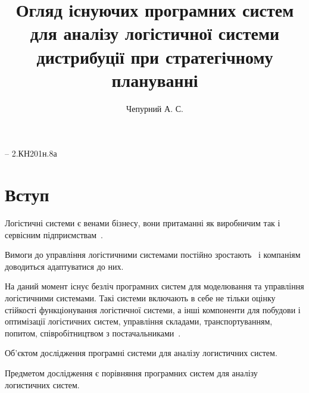 


\usepackage{lastpage}
\usepackage{calc}
\usepackage{soul}
\usepackage{pbox}
\usepackage{ulem}
\usepackage{titling}
\usepackage{framed}
\usepackage{tabu}
\usepackage{lscape}
\usepackage{appendix}
\usepackage{pdflscape}
\usepackage{longtable}
\usepackage[figure,table]{totalcount}

\title{Огляд існуючих програмних систем для аналізу логістичної системи дистрибуції при стратегічному плануванні}
\author{Чепурний А. С.}
 



\Ukrainian

\begin{titlepage}
\begin{center}
	\small
		\textbf{\theauthor} -- 2.КН201н.8а
\end{center}

\vspace*{\fill}
\begin{center}
	\Large
		\thetitle
\end{center}
\vspace*{\fill}

\end{titlepage}

\addtocounter{page}{1}


\section*{Вступ}
Логістичні системи є венами бізнесу, вони притаманні як виробничим так і сервісним підприємствам~\cite{Wanga}.

Вимоги до управління логістичними системами постійно зростають~\cite{Wanga,Croom2000} і компаніям доводиться адаптуватися до них. 

На даний момент існує безліч програмних систем для моделювання та управління логістичними системами.
Такі системи включають в себе не тільки оцінку стійкості функціонування логістичної системи, а інші компоненти для побудови і оптимізації логістичних систем, управління складами, транспортуванням, попитом, співробітництвом з постачальниками~\cite{Das2007,Hill2007}.   

Об'єктом дослідження програмні системи для аналізу логистичних систем.

Предметом дослідження є порівняння програмних систем для аналізу логистичних систем.

